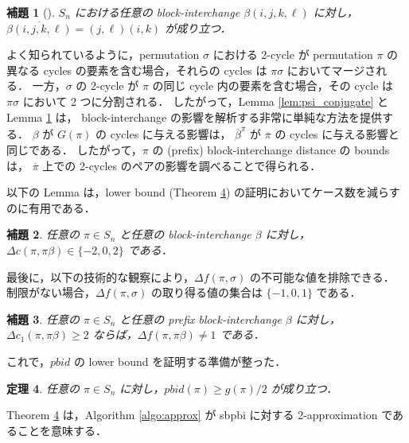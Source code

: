 \documentclass[paper=a4,fontsize=11pt,report,oneside]{jlreq}
\newtheorem{theorem}{定理}[chapter]
\newtheorem{lemma}[theorem]{補題}
\begin{document}
\begin{lemma}[\cite{labarre2013lower}] \label{lem:psi_bi}
    $S_n$ における任意の block-interchange $\beta(i, j, k, \ell)$ に対し，
    $\overline{\beta(i, j, k, \ell)} = (j, \ell)(i, k)$ が成り立つ．
\end{lemma}

よく知られているように，permutation $\sigma$ における 2-cycle が
permutation $\pi$ の異なる cycles の要素を含む場合，それらの cycles は $\pi\sigma$ においてマージされる．
一方，$\sigma$ の 2-cycle が $\pi$ の同じ cycle 内の要素を含む場合，その cycle は $\pi\sigma$ において 2 つに分割される．
したがって，Lemma \ref{lem:psi_conjugate} と Lemma \ref{lem:psi_bi} は，
block-interchange の影響を解析する非常に単純な方法を提供する．
$\beta$ が $G(\pi)$ の cycles に与える影響は，
$\overline{\beta}^{\overline{\pi}}$ が $\overline{\pi}$ の cycles に与える影響と同じである．
したがって，$\pi$ の (prefix) block-interchange distance の bounds は，
$\overline{\pi}$ 上での 2-cycles のペアの影響を調べることで得られる．

以下の Lemma は，lower bound (Theorem \ref{thm:lowerbound_strict}) の証明においてケース数を減らすのに有用である．

\begin{lemma} \label{lem:delta_c_cases}
    任意の $\pi \in S_n$ と任意の block-interchange $\beta$ に対し，
    $\Delta c(\pi, \pi\beta) \in \{-2, 0, 2\}$ である．
\end{lemma}


最後に，以下の技術的な観察により，$\Delta f(\pi, \sigma)$ の不可能な値を排除できる．
制限がない場合，$\Delta f(\pi, \sigma)$ の取り得る値の集合は $\{-1, 0, 1\}$ である．

\begin{lemma} \label{lem:delta_f_restriction}
    任意の $\pi \in S_n$ と任意の prefix block-interchange $\beta$ に対し，
    $\Delta c_1(\pi, \pi\beta) \ge 2$ ならば，$\Delta f(\pi, \pi\beta) \neq 1$ である．
\end{lemma}


これで，$pbid$ の lower bound を証明する準備が整った．

\begin{theorem} \label{thm:lowerbound_strict}
    任意の $\pi \in S_n$ に対し，$pbid(\pi) \ge g(\pi)/2$ が成り立つ．
\end{theorem}


Theorem \ref{thm:lowerbound_strict} は，Algorithm \ref{algo:approx} が sbpbi に対する 2-approximation であることを意味する．
\end{document}
